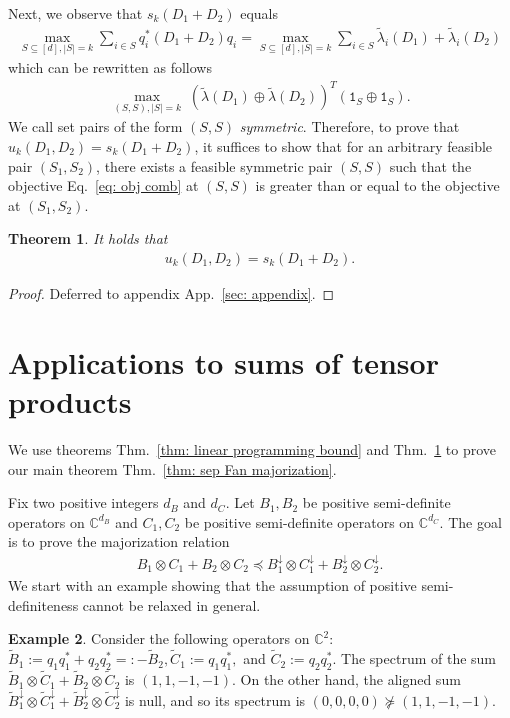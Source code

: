 \documentclass[12pt]{article}
\newtheorem{thm}{Theorem}[section]
\theoremstyle{definition}
\newtheorem{example}[thm]{Example}
\numberwithin{equation}{section}
\numberwithin{equation}{section}
\newcommand{\la}{\lambda}
\newcommand{\one}{\mathtt{1}}
\newcommand{\da}{\downarrow}
\newcommand{\bC}{\mathbb{C}}
\begin{document}
Next, we observe that \(s_k(D_1 + D_2)\) equals 
\begin{align}
\label{eq: observation about symmetric set pair}
\max_{S \subseteq [d], |S|=k} \sum_{i \in S} q_i^* (D_1 +  D_2) q_i = \max_{S \subseteq [d], |S|=k} \sum_{i \in S} \tilde{\la}_i (D_1) + \tilde{\la}_i (D_2)
\end{align}
which can be rewritten as follows
\begin{align}
\max_{(S, S), |S|=k} \; (\tilde{\la} (D_1) \oplus \tilde{\la} (D_2))^T (\one_{S} \oplus \one_{S}).
\end{align}                                 
We call set pairs of the form \((S, S)\) \textit{symmetric}. Therefore, to prove that \(u_k (D_1, D_2) = s_k (D_1 + D_2)\), it suffices to show that for an arbitrary feasible pair \((S_1, S_2)\), there exists a feasible symmetric pair \((S, S)\) such that the objective Eq.~\ref{eq: obj comb} at \((S,S)\) is greater than or equal to the objective at \((S_1, S_2)\). 

\begin{thm}
\label{thm: tightness for diagonal operators}
It holds that 
\begin{gather}
u_k (D_1, D_2) = s_k (D_1 + D_2).    
\end{gather}
\end{thm}
\begin{proof}
Deferred to appendix App.~\ref{sec: appendix}. 
\end{proof}


\section{Applications to sums of tensor products}
\label{sec: applications to sums}
We use theorems Thm.~\ref{thm: linear programming bound} and Thm.~\ref{thm: tightness for diagonal operators} to prove our main theorem Thm.~\ref{thm: sep Fan majorization}. 


Fix two positive integers \(d_B\) and  \(d_C\). Let \(B_1, B_2\) be positive semi-definite operators on \(\bC^{d_B}\) and \(C_1, C_2\) be positive semi-definite operators on \(\bC^{d_C}\). The goal is to prove the majorization relation
\begin{align}
\label{rel: sep fan again}
B_1 \otimes C_1 + B_2 \otimes C_2 \preceq B_1^{\da} \otimes C_1^{\da} + B_2^{\da} \otimes C_2^{\da}. 
\end{align}
We start with an example showing that the assumption of positive semi-definiteness cannot be relaxed in general. 
\begin{example}
\label{ex: counter example with negative eigenvalues}
Consider the following operators on $\bC^2$: \(\tilde{B}_{1} := q_1 q_1^* + q_2 q_2^* =: - \tilde{B}_{2}, \tilde{C}_1 := q_{1} q_{1}^*,\) and \(\tilde{C}_2 := q_{2} q_{2}^*\). The spectrum of the sum \(\tilde{B}_1 \otimes \tilde{C}_1 + \tilde{B}_2 \otimes \tilde{C}_2\) is \((1,1,-1,-1)\). On the other hand, the aligned sum \(\tilde{B}_1^\da \otimes \tilde{C}_1^\da + \tilde{B}_2^{\da} \otimes \tilde{C}_2^{\da}\) is null, and so its spectrum is \((0,0,0,0) \not\succeq (1,1,-1,-1)\).
\end{example}
\end{document}
